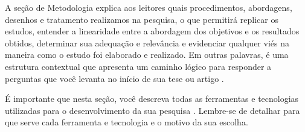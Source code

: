 A seção de Metodologia explica aos leitores quais procedimentos, abordagens, desenhos e tratamento realizamos na pesquisa, o que permitirá replicar os estudos, entender a linearidade entre a abordagem dos objetivos e os resultados obtidos, determinar sua adequação e relevância e evidenciar qualquer viés na maneira como o estudo foi elaborado e realizado. Em outras palavras, é uma estrutura contextual que apresenta um caminho lógico para responder a perguntas que você levanta no início de sua tese ou artigo \cite{knuth:84}. 

É importante que nesta seção, você descreva todas as ferramentas e tecnologias utilizadas para o desenvolvimento da sua pesquisa \cite{boulic:91}. Lembre-se de detalhar para que serve cada ferramenta e tecnologia e o motivo da sua escolha.
